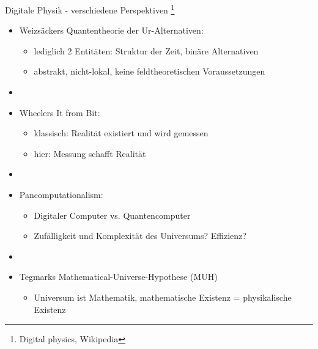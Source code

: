 \documentclass[aspectratio=1610, 9pt]{beamer}
\begin{document}
\begin{frame}{Digitale Physik - verschiedene Perspektiven \footnote[1]{Digital physics, Wikipedia}}
  \begin{itemize}
    \item Weizsäckers Quantentheorie der Ur-Alternativen:
      \begin{itemize}
        \item[\bullet] lediglich 2  Entitäten: Struktur der Zeit, binäre Alternativen
        \item[\bullet] abstrakt, nicht-lokal, keine feldtheoretischen Voraussetzungen
      \end{itemize}
    \item[]
    \item Wheelers It from Bit:
      \begin{itemize}
        \item[\bullet] klassisch: Realität existiert und wird gemessen
        \item[\bullet] hier: Messung schafft Realität
      \end{itemize}
    \item[]
    \item Pancomputationalism:
      \begin{itemize}
        \item[\bullet] Digitaler Computer vs. Quantencomputer
        \item[\bullet] Zufälligkeit und Komplexität des Universums? Effizienz?
      \end{itemize}
    \item[]
    \item Tegmarks Mathematical-Universe-Hypothese (MUH)
      \begin{itemize}
        \item[\bullet] Universum ist Mathematik, mathematische Existenz = physikalische Existenz
      \end{itemize}
  \end{itemize}
\end{frame}
\end{document}

